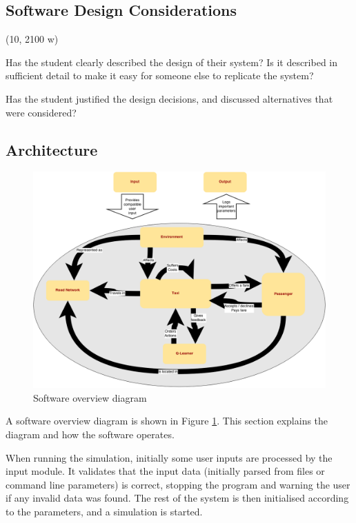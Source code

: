 \subsection{Software Design Considerations}

(10, 2100 w)

Has the student clearly described the design of their system? Is it described
in sufficient detail to make it easy for someone else to replicate the system?

Has the student justified the design decisions, and discussed alternatives that
were considered?


\subsection{Architecture} 
\label{sec:design:architecture}


\begin{figure}
  \begin{center}
    \includegraphics[width=\textwidth]{../figures/software_overview}
    \caption{
      Software overview diagram
      \label{figure:design:software}
    }
  \end{center}
\end{figure}

A software overview diagram is shown in Figure \ref{figure:design:software}.
This section explains the diagram and how the software operates.

When running the simulation, initially some user inputs are processed by the
input module. It validates that the input data (initially parsed from files or
command line parameters) is correct, stopping the program and warning the user
if any invalid data was found. The rest of the system is then initialised
according to the parameters, and a simulation is started.

